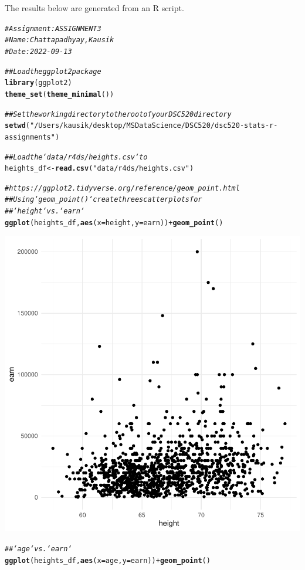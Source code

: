\documentclass{article}\usepackage[]{graphicx}\usepackage[]{xcolor}
\makeatletter
\newcommand{\hlstr}[1]{\textcolor[rgb]{0.192,0.494,0.8}{#1}}%
\newcommand{\hlcom}[1]{\textcolor[rgb]{0.678,0.584,0.686}{\textit{#1}}}%
\newcommand{\hlopt}[1]{\textcolor[rgb]{0,0,0}{#1}}%
\newcommand{\hlstd}[1]{\textcolor[rgb]{0.345,0.345,0.345}{#1}}%
\newcommand{\hlkwb}[1]{\textcolor[rgb]{0.69,0.353,0.396}{#1}}%
\newcommand{\hlkwc}[1]{\textcolor[rgb]{0.333,0.667,0.333}{#1}}%
\newcommand{\hlkwd}[1]{\textcolor[rgb]{0.737,0.353,0.396}{\textbf{#1}}}%
\newenvironment{kframe}{%
 \def\at@end@of@kframe{}%
 \ifinner\ifhmode%
  \def\at@end@of@kframe{\end{minipage}}%
  \begin{minipage}{\columnwidth}%
 \fi\fi%
 \def\FrameCommand##1{\hskip\@totalleftmargin \hskip-\fboxsep
 \colorbox{shadecolor}{##1}\hskip-\fboxsep
     \hskip-\linewidth \hskip-\@totalleftmargin \hskip\columnwidth}%
 \MakeFramed {\advance\hsize-\width
   \@totalleftmargin\z@ \linewidth\hsize
   \@setminipage}}%
 {\par\unskip\endMakeFramed%
 \at@end@of@kframe}
\newenvironment{knitrout}{}{} %
\makeatother
\begin{document}
The results below are generated from an R script.

\begin{knitrout}
\color{fgcolor}\begin{kframe}
\begin{alltt}
\hlcom{# Assignment: ASSIGNMENT 3}
\hlcom{# Name: Chattapadhyay, Kausik}
\hlcom{# Date: 2022-09-13}

\hlcom{## Load the ggplot2 package}
\hlkwd{library}\hlstd{(ggplot2)}
\hlkwd{theme_set}\hlstd{(}\hlkwd{theme_minimal}\hlstd{())}

\hlcom{## Set the working directory to the root of your DSC 520 directory}
\hlkwd{setwd}\hlstd{(}\hlstr{"/Users/kausik/desktop/MS Data Science/DSC 520/dsc520-stats-r-assignments"}\hlstd{)}

\hlcom{## Load the `data/r4ds/heights.csv` to}
\hlstd{heights_df} \hlkwb{<-} \hlkwd{read.csv}\hlstd{(}\hlstr{"data/r4ds/heights.csv"}\hlstd{)}

\hlcom{# https://ggplot2.tidyverse.org/reference/geom_point.html}
\hlcom{## Using `geom_point()` create three scatterplots for}
\hlcom{## `height` vs. `earn`}
\hlkwd{ggplot}\hlstd{(heights_df,} \hlkwd{aes}\hlstd{(}\hlkwc{x}\hlstd{=height,} \hlkwc{y}\hlstd{=earn))} \hlopt{+} \hlkwd{geom_point}\hlstd{()}
\end{alltt}
\end{kframe}

{\centering \includegraphics[width=.6\linewidth]{figure/assignment-03-ChattapadhyayKausik-Rnwauto-report-1} 

}


\begin{kframe}\begin{alltt}
\hlcom{## `age` vs. `earn`}
\hlkwd{ggplot}\hlstd{(heights_df,} \hlkwd{aes}\hlstd{(}\hlkwc{x}\hlstd{=age,} \hlkwc{y}\hlstd{=earn))} \hlopt{+} \hlkwd{geom_point}\hlstd{()}
\end{alltt}
\end{kframe}


\end{knitrout}
\end{document}
